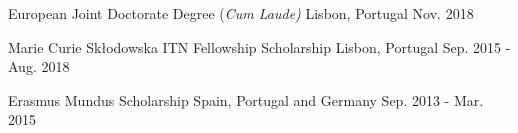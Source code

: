 


\begin{cventries}


   
    

  \cventry
    {} %
    {European Joint Doctorate Degree (\textit{Cum Laude)}} %
    {Lisbon, Portugal} %
    {Nov. 2018} %
    {    }

\vspace{-4mm}
    
    \cventry
    {} %
    {Marie Curie Skłodowska ITN Fellowship Scholarship} %
    {Lisbon, Portugal} %
    {Sep. 2015 - Aug. 2018} %
    {    }

\vspace{-4mm}
   
    
    \cventry
    {} %
    {Erasmus Mundus Scholarship} %
    {Spain, Portugal and Germany} %
    {Sep. 2013 - Mar. 2015} %
    {    }

\vspace{-4mm}

    
\end{cventries}

\vspace{-7mm}